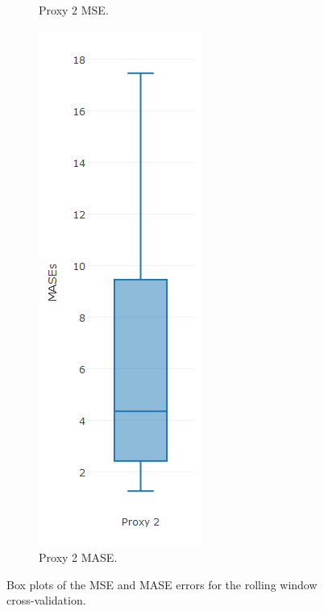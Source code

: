 \begin{figure}[!h]
{\begin{subfigure}{.25\linewidth}
  \caption{Proxy 2 MSE.}
  \label{fig:bp3c}
\end{subfigure}
\begin{subfigure}{.25\linewidth}
  \centering
  \includegraphics[width=\linewidth]{img/6mmaMasebpNaive.png}
  \caption{Proxy 2 MASE.}
  \label{fig:bp4c}
\end{subfigure}}
\caption{Box plots of the MSE and MASE errors for the rolling window cross-validation.}
\end{figure}